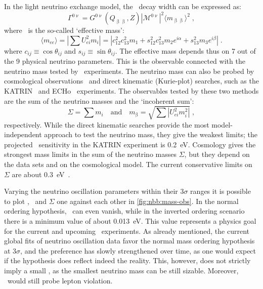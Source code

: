 In the light neutrino exchange model, the \onbb\ decay width can be expressed as:
\begin{equation}\label{eq:nbb:0nudecayrate}
  \Gamma^{0\upnu} = G^{0\upnu}(Q_{\upbeta\upbeta}, Z)
                  |\mathcal{M}^{0\upnu}|^2
                  \langle{m_{\upbeta\upbeta}}\rangle^2 \;,
\end{equation}
where \mbb\ is the so-called `effective mass':
\[
  \langle m_{ee} \rangle = \left| \sum U_{ei}^2 m_i \right|
                         = |c^2_{12} c^2_{13} m_1
                            + s^2_{12} c^2_{13} m_2 e^{i\alpha}
                            + s^2_{13} m_3 e^{i\beta}| \;.
\]
where $c_{ij} \equiv \cos{\theta_{ij}}$ and $s_{ij} \equiv \sin{\theta_{ij}}$.
The effective mass depends thus on 7 out of the 9 physical neutrino parameters.
This is the observable connected with the neutrino mass tested by \onbb\
experiments.  The neutrino mass can also be probed by cosmological
observations~\cite{Gerbino2018} and direct kinematic (Kurie-plot) searches,
such as the KATRIN~\cite{Aker2019} and ECHo~\cite{Gastaldo2018} experiments.
The observables tested by these two methods are the sum of the neutrino masses
and the `incoherent sum':
\[
  \Sigma = \sum m_i \quad \text{and} \quad m_{\upbeta}
         = \sqrt{\sum |U_{ei}^2 m_i^2|} \;,
\]
respectively. While the direct kinematic searches provide the most
model-independent approach to test the neutrino mass, they give the weakest
limits; the projected \mb\ sensitivity in the KATRIN experiment is 0.2~eV.
Cosmology gives the strongest mass limits in the sum of the neutrino masses
$\Sigma$, but they depend on the data sets and on the cosmological model. The
current conservative limits on $\Sigma$ are about 0.3~eV~\cite{Aghanim2018}.

Varying the neutrino oscillation parameters within their $3\sigma$ ranges it is
possible to plot \mbb, \mb\ and $\Sigma$ one against each other in
\cref{fig:nbb:mass-obs}. In the normal ordering hypothesis, \mbb\ can even
vanish, while in the inverted ordering scenario there is a minimum value of
about 0.013~eV. This value represents a physics goal for the current and
upcoming \onbb\ experiments.  As already mentioned, the current global fits of
neutrino oscillation data favor the normal mass ordering hypothesis at
$3\sigma$, and the preference has slowly strengthened over time, as one would
expect if the hypothesis does reflect indeed the reality. This, however, does
not strictly imply a small \mbb, as the smallest neutrino mass can be still
sizable. Moreover, \onbb\ would still probe lepton violation.

